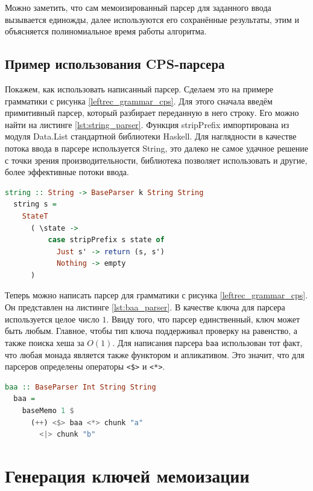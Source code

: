 \documentclass[times]{itmo-student-thesis}
\begin{document}
Можно заметить, что сам мемоизированный парсер для заданного ввода вызывается единожды, далее используются его
сохранённые результаты, этим и объясняется полиномиальное время работы алгоритма.

\subsection{Пример использования CPS-парсера}\label{sec:cps_parser_example}

Покажем, как использовать написанный парсер. Сделаем это на примере грамматики с рисунка \ref{leftrec_grammar_cps}.
Для этого сначала введём примитивный парсер, который разбирает переданную в него строку. Его можно найти на листинге
\ref{lst:string_parser}. Функция stripPrefix импортирована из модуля Data.List стандартной библиотеки Haskell. Для
наглядности в качестве потока ввода в парсере используется String,  это далеко не самое удачное решение с точки зрения
производительности, библиотека позволяет использовать и другие, более эффективные потоки ввода.

\begin{lstlisting}[language=Haskell,float=!h,caption={Парсер для строки},label={lst:string_parser}]
  string :: String -> BaseParser k String String
  string s =
    StateT
      ( \state ->
          case stripPrefix s state of
            Just s' -> return (s, s')
            Nothing -> empty
      )
\end{lstlisting}

Теперь можно написать парсер для грамматики с рисунка \ref{leftrec_grammar_cps}. Он представлен на листинге
\ref{lst:baa_parser}.	В качестве ключа для парсера используется целое число $1$. Ввиду того, что
парсер единственный, ключ может быть любым. Главное, чтобы тип ключа поддерживал проверку на равенство, а также поиска
хеша за $O(1)$. Для написания парсера \lstinline{baa} использован тот факт, что любая монада
является также функтором и апликативом. Это значит, что для парсеров определены операторы
\lstinline{<$>} и \lstinline{<*>}.

\begin{lstlisting}[language=Haskell,float=!h,caption={Парсер для строк $ba^*$},label={lst:baa_parser}]
  baa :: BaseParser Int String String
  baa =
    baseMemo 1 $
      (++) <$> baa <*> chunk "a"
        <|> chunk "b"
\end{lstlisting}

\section{Генерация ключей мемоизации}\label{sec:memoization_keys}
\end{document}
